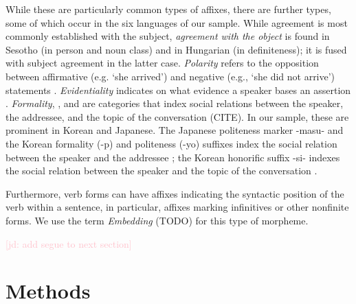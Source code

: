 \documentclass[11pt,letterpaper]{article}
\newcommand{\citep}{\parencite}
\newcommand{\jd}[1]{\textcolor{Pink}{[jd: #1]}}
\newcounter{def}
\begin{document}
While these are particularly common types of affixes, there are further types, some of which occur in the six languages of our sample.
While agreement is most commonly established with the subject, \textit{agreement with the object} is found in Sesotho \citep{doke1967textbook} (in person and noun class) and in Hungarian \citep{rounds2001hungarian} (in definiteness); it is fused with subject agreement in the latter case.
\textit{Polarity} refers to the opposition between affirmative (e.g. `she arrived') and negative  (e.g., `she did not arrive') statements \citep{wals-112}.
\textit{Evidentiality} indicates on what evidence a speaker bases an assertion \citep{aikhenvald2003evidentiality}.
\textit{Formality}, , and  are categories that index social relations between the speaker, the addressee, and the topic of the conversation (CITE).
In our sample, these are prominent in Korean and Japanese.
The Japanese politeness marker -masu- and the Korean formality (-p) and politeness (-yo) suffixes index the social relation between the speaker and the addressee \citep{hasegawa2014japanese, yeon2010korean}; the Korean honorific suffix -si- indexes the social relation between the speaker and the topic of the conversation \citep{yeon2010korean}.

Furthermore, verb forms can have affixes indicating the syntactic position of the verb within a sentence, in particular, affixes marking infinitives or other nonfinite forms.
We use the term \textit{Embedding} (TODO) for this type of morpheme.

\jd{add segue to next section}





\section{Methods}
\end{document}
